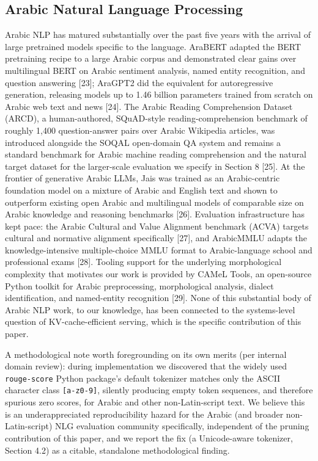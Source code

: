 \documentclass[pdflatex,sn-basic,Numbered]{sn-jnl}
\begin{document}
\subsection{Arabic Natural Language Processing}
Arabic NLP has matured substantially over the past five years with the arrival of large pretrained models specific to the language. AraBERT adapted the BERT pretraining recipe to a large Arabic corpus and demonstrated clear gains over multilingual BERT on Arabic sentiment analysis, named entity recognition, and question answering [23]; AraGPT2 did the equivalent for autoregressive generation, releasing models up to 1.46 billion parameters trained from scratch on Arabic web text and news [24]. The Arabic Reading Comprehension Dataset (ARCD), a human-authored, SQuAD-style reading-comprehension benchmark of roughly 1,400 question-answer pairs over Arabic Wikipedia articles, was introduced alongside the SOQAL open-domain QA system and remains a standard benchmark for Arabic machine reading comprehension and the natural target dataset for the larger-scale evaluation we specify in Section 8 [25]. At the frontier of generative Arabic LLMs, Jais was trained as an Arabic-centric foundation model on a mixture of Arabic and English text and shown to outperform existing open Arabic and multilingual models of comparable size on Arabic knowledge and reasoning benchmarks [26]. Evaluation infrastructure has kept pace: the Arabic Cultural and Value Alignment benchmark (ACVA) targets cultural and normative alignment specifically [27], and ArabicMMLU adapts the knowledge-intensive multiple-choice MMLU format to Arabic-language school and professional exams [28]. Tooling support for the underlying morphological complexity that motivates our work is provided by CAMeL Tools, an open-source Python toolkit for Arabic preprocessing, morphological analysis, dialect identification, and named-entity recognition [29]. None of this substantial body of Arabic NLP work, to our knowledge, has been connected to the systems-level question of KV-cache-efficient serving, which is the specific contribution of this paper.

A methodological note worth foregrounding on its own merits (per internal domain review): during implementation we discovered that the widely used \texttt{rouge-score} Python package's default tokenizer matches only the ASCII character class \texttt{[a-z0-9]}, silently producing empty token sequences, and therefore spurious zero scores, for Arabic and other non-Latin-script text. We believe this is an underappreciated reproducibility hazard for the Arabic (and broader non-Latin-script) NLG evaluation community specifically, independent of the pruning contribution of this paper, and we report the fix (a Unicode-aware tokenizer, Section 4.2) as a citable, standalone methodological finding.
\end{document}
